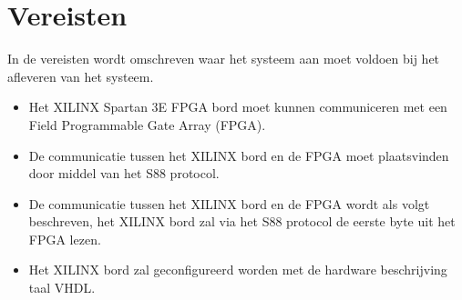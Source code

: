 \textit{}\chapter{Vereisten}
In de vereisten wordt omschreven waar het systeem aan moet voldoen bij het afleveren van het systeem.\\
\begin{itemize}
	\item Het XILINX Spartan 3E FPGA bord moet kunnen communiceren met een Field Programmable Gate Array (FPGA).
	\item De communicatie tussen het XILINX bord en de FPGA moet plaatsvinden door middel van het S88 protocol.
	\item De communicatie tussen het XILINX bord en de FPGA wordt als volgt beschreven, het XILINX bord zal via het S88 protocol de eerste byte uit het FPGA lezen.
	\item Het XILINX bord zal geconfigureerd worden met de hardware beschrijving taal VHDL.
\end{itemize}